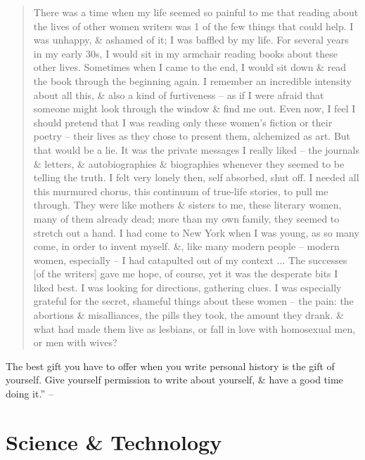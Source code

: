 \documentclass{article}
\begin{document}
\begin{quotation}
	There was a time when my life seemed so painful to me that reading about the lives of other women writers was 1 of the few things that could help. I was unhappy, \& ashamed of it; I was baffled by my life. For several years in my early 30s, I would sit in my armchair reading books about these other lives. Sometimes when I came to the end, I would sit down \& read the book through the beginning again. I remember an incredible intensity about all this, \& also a kind of furtiveness -- as if I were afraid that someone might look through the window \& find me out. Even now, I feel I should pretend that I was reading only these women's fiction or their poetry -- their lives as they chose to present them, alchemized as art. But that would be a lie. It was the private messages I really liked -- the journals \& letters, \& autobiographies \& biographies whenever they seemed to be telling the truth. I felt very lonely then, self absorbed, shut off. I needed all this murmured chorus, this continuum of true-life stories, to pull me through. They were like mothers \& sisters to me, these literary women, many of them already dead; more than my own family, they seemed to stretch out a hand. I had come to New York when I was young, as so many come, in order to invent myself. \&, like many modern people -- modern women, especially -- I had catapulted out of my context $\ldots$ The successes [of the writers] gave me hope, of course, yet it was the desperate bits I liked best. I was looking for directions, gathering clues. I was especially grateful for the secret, shameful things about these women -- the pain: the abortions \& misalliances, the pills they took, the amount they drank. \& what had made them live as lesbians, or fall in love with homosexual men, or men with wives?
\end{quotation}
The best gift you have to offer when you write personal history is the gift of yourself. Give yourself permission to write about yourself, \& have a good time doing it.'' -- \cite[pp. 128--140]{Zinsser2016}


\section{Science \& Technology}

\end{document}
